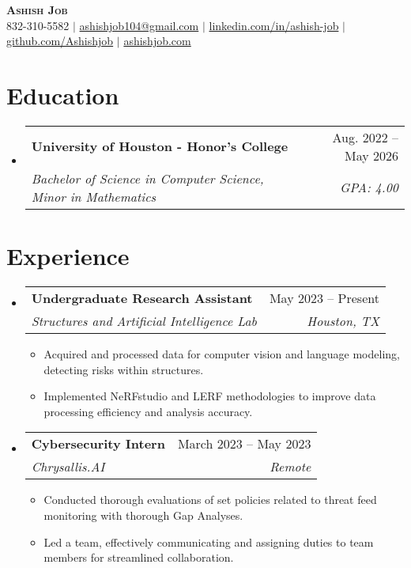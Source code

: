 \documentclass[letterpaper,11pt]{article}
\makeatletter
\newcommand{\resumeItem}[1]{
  \item\small{
    {#1 \vspace{-2pt}}
  }
}
\newcommand{\resumeSubheading}[4]{
  \vspace{-2pt}\item
    \begin{tabular*}{0.97\textwidth}[t]{l@{\extracolsep{\fill}}r}
      \textbf{#1} & #2 \\
      \textit{\small#3} & \textit{\small #4} \\
    \end{tabular*}\vspace{-7pt}
}
\newcommand{\resumeSubSubheading}[2]{
    \item
    \begin{tabular*}{0.97\textwidth}{l@{\extracolsep{\fill}}r}
      \textit{\small#1} & \textit{\small #2} \\
    \end{tabular*}\vspace{-7pt}
}
\newcommand{\resumeSubHeadingListStart}{\begin{itemize}[leftmargin=0.15in, label={}]}
\newcommand{\resumeSubHeadingListEnd}{\end{itemize}}
\newcommand{\resumeItemListStart}{\begin{itemize}}
\newcommand{\resumeItemListEnd}{\end{itemize}\vspace{-5pt}}
\makeatother
\begin{document}

\begin{center}
    \textbf{\Huge \scshape Ashish Job} \\ \vspace{1pt}
    \small {832-310-5582} $|$ \href{mailto:ashishjob104@gmail.com}{{ashishjob104@gmail.com}} $|$ 
    \href{https://linkedin.com/in/ashish-job/}{{linkedin.com/in/ashish-job}} 
    $|$ \href{https://github.com/Ashishjob}{{github.com/Ashishjob}}
    $|$ \href{https://ashishjob.com/}{{ashishjob.com}}
    
\end{center}


\section{Education}
  \resumeSubHeadingListStart
    \resumeSubheading
      {University of Houston - Honor's College}{Aug. 2022 -- May 2026}
      {Bachelor of Science in Computer Science, Minor in Mathematics}{GPA: 4.00}
  \resumeSubHeadingListEnd


\section{Experience}
  \resumeSubHeadingListStart
  
  \resumeSubheading
      {Undergraduate Research Assistant}{May 2023 -- Present}
      {Structures and Artificial Intelligence Lab}{Houston, TX}
      \resumeItemListStart
        \resumeItem{Acquired and processed data for computer vision and language modeling, detecting risks within structures.}
        \resumeItem{Implemented NeRFstudio and LERF methodologies to improve data processing efficiency and analysis accuracy.}
      \resumeItemListEnd
    \resumeSubheading
      {Cybersecurity Intern}{March 2023 -- May 2023}
      {Chrysallis.AI}{Remote}
      \resumeItemListStart
        \resumeItem{Conducted thorough evaluations of set policies related to threat feed monitoring with thorough Gap Analyses.}
        \resumeItem{Led a team, effectively communicating and assigning duties to team members for streamlined collaboration.}
      \resumeItemListEnd
    \resumeSubHeadingListEnd
      
\end{document}
